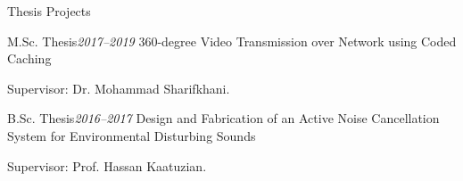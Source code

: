 \documentclass{resume} %
\begin{document}

\begin{rSection}{Thesis Projects}
\vspace{+.1cm}

\begin{rSubsection}{M.Sc. Thesis}{\em 2017--2019}
{360-degree Video Transmission over Network using Coded Caching}  

    \item Supervisor: Dr. Mohammad Sharifkhani.
\end{rSubsection}

\pagebreak

\begin{rSubsection}{B.Sc. Thesis}{\em 2016--2017}
{Design and Fabrication of an Active Noise Cancellation System for Environmental Disturbing Sounds}

    \item Supervisor: Prof. Hassan Kaatuzian.
\end{rSubsection}

\end{rSection}

\end{document}

